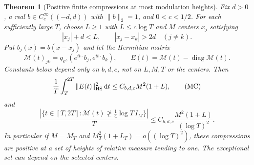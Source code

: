 \documentclass[11pt]{article}
\newtheorem{theorem}{Theorem}
\theoremstyle{remark}\newtheorem{remark}[theorem]{Remark}
\newcommand{\dd}{\,\mathrm d}
\begin{document}
\begin{theorem}[Positive finite compressions at most modulation heights]
\label{thm:mean-compressions}
Fix $d>0$, a real $b\in C_c^\infty((-d,d))$ with $\|b\|_2=1$,
and $0<c<1/2$. For each sufficiently large $T$, choose $L\ge1$
with $L\le c\log T$ and $M$ centers $x_j$ satisfying
\[
 |x_j|+d<L,\qquad |x_j-x_k|>2d\quad(j\ne k).
\]
Put $b_j(x)=b(x-x_j)$ and let the Hermitian matrix
\[
 \mathcal M(t)_{jk}=q_{e^L}(e^{it\cdot}b_j,e^{it\cdot}b_k),
 \qquad E(t)=\mathcal M(t)-\operatorname{diag}\mathcal M(t).
\]
Constants below depend only on $b,d,c$, not on $L,M,T$ or the centers.
Then
\[
 \frac1T\int_T^{2T}\|E(t)\|_{\rm HS}^2\dd t
                \le C_{b,d,c}M^2(1+L),                \tag{MC}
\]
and
\[
 \frac{|\{t\in[T,2T]:\mathcal M(t)\not\ge
                         \tfrac14\log T\,I_M\}|}{T}
       \le C_{b,d,c}\frac{M^2(1+L)}{(\log T)^2}.      \tag{MP}
\]
In particular if $M=M_T$ and
$M_T^2(1+L_T)=o((\log T)^2)$, these compressions are positive
at a set of heights of relative measure tending to one.
The exceptional set can depend on the selected centers.
\end{theorem}
\end{document}
